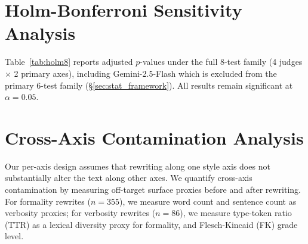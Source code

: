 \section{Holm-Bonferroni Sensitivity Analysis}
\label{app:holm8}

Table~\ref{tab:holm8} reports adjusted $p$-values under the full 8-test family (4 judges $\times$ 2 primary axes), including Gemini-2.5-Flash which is excluded from the primary 6-test family (\S\ref{sec:stat_framework}).
All results remain significant at $\alpha = 0.05$.

\begin{table}[h]
\centering
\small
\caption{Holm-Bonferroni sensitivity analysis: 8-test family (4 judges $\times$ 2 primary axes). All results remain significant under the expanded family ($\alpha = 0.05$).}
\label{tab:holm8}
\end{table}

\section{Cross-Axis Contamination Analysis}
\label{app:cross_axis_contamination}

Our per-axis design assumes that rewriting along one style axis does not substantially alter the text along other axes.
We quantify cross-axis contamination by measuring off-target surface proxies before and after rewriting.
For formality rewrites ($n = 355$), we measure word count and sentence count as verbosity proxies; for verbosity rewrites ($n = 86$), we measure type-token ratio (TTR) as a lexical diversity proxy for formality, and Flesch-Kincaid (FK) grade level.

